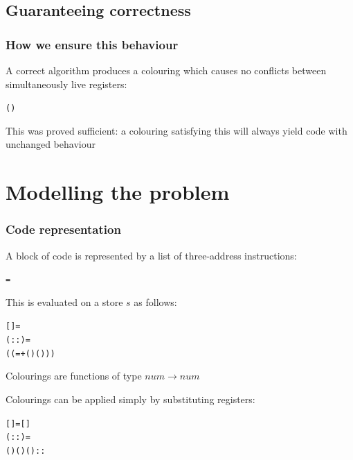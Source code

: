 \documentclass{beamer}
\begin{document}
\subsection{Guaranteeing correctness}
\begin{frame}[containsverbatim]
\frametitle{How we ensure this behaviour}
A correct algorithm produces a colouring which causes no conflicts between simultaneously live registers:

\begin{alltt}\small
	    \HOLTokenEquiv{}
 
  (  )
\end{alltt}

This was proved sufficient: a colouring satisfying this will always yield code with unchanged behaviour
\end{frame}

\section{Modelling the problem}
\begin{frame}[containsverbatim]
\frametitle{Code representation}
A block of code is represented by a list of three-address instructions:

\begin{alltt}\small
	 =    \HOLTokenImp{}  \HOLTokenImp{} 
\end{alltt}

This is evaluated on a store $s$ as follows:

\begin{alltt}\small
	   = 
   (   ::) =
  (( =+  ( ) ( )) ) 
\end{alltt}
\end{frame}

\begin{frame}[containsverbatim]
Colourings are functions of type $num \rightarrow num$

Colourings can be applied simply by substituting registers:

\begin{alltt}\small
	  = []
  (   ::) =
 ( ) ( ) ( )::  
\end{alltt}
\end{frame}
\end{document}
